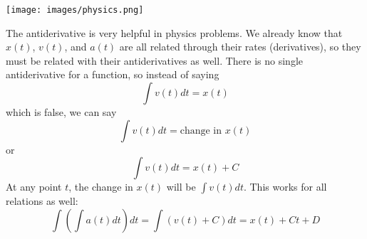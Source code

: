 \documentclass[../revisedmain.tex]{subfiles}
\begin{document}
	\vspace{.125in}
	\begin{center}
		\texttt{[image: images/physics.png]}
	\end{center}
	\vspace{.25in}
The antiderivative is very helpful in physics problems. We already know that $x(t)$, $v(t)$, and $a(t)$ are all related through their rates (derivatives), so they must be related with their antiderivatives as well. There is no single antiderivative for a function, so instead of saying $$\int v(t) dt=x(t)$$ which is false, we can say$$\int v(t)dt=\text{change in }x(t)$$or$$\int v(t)dt=x(t)+C$$At any point $t$, the change in $x(t)$ will be $\int v(t) dt$. This works for all relations as well:$$\int\left(\int a(t) dt\right)dt=\int (v(t)+C)dt=x(t)+Ct+D$$
\end{document}
